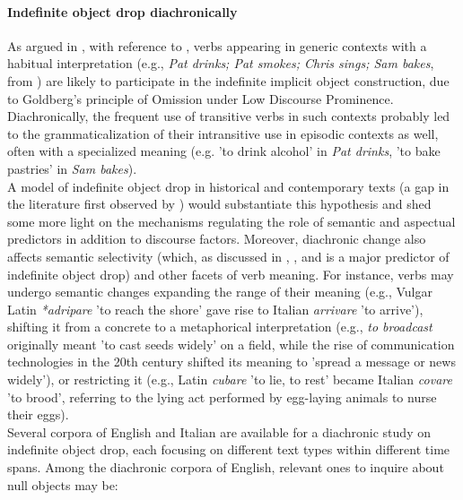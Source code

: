 \paragraph{Indefinite object drop diachronically}
As argued in , with reference to \textcite{Goldberg2001, Goldberg2005a, Lorenzetti2008, Glass2020}, verbs appearing in generic contexts with a habitual interpretation (e.g., \textit{Pat drinks; Pat smokes; Chris sings; Sam bakes}, from \textcite[518]{Goldberg2001}) are likely to participate in the indefinite implicit object construction, due to Goldberg's principle of Omission under Low Discourse Prominence. Diachronically, the frequent use of transitive verbs in such contexts probably led to the grammaticalization of their intransitive use in episodic contexts as well, often with a specialized meaning (e.g. 'to drink alcohol' in \textit{Pat drinks}, 'to bake pastries' in \textit{Sam bakes}).\\
A model of indefinite object drop in historical and contemporary texts (a gap in the literature first observed by \textcite{Goldberg2001}) would substantiate this hypothesis and shed some more light on the mechanisms regulating the role of semantic and aspectual predictors in addition to discourse factors. Moreover, diachronic change also affects semantic selectivity (which, as discussed in , , and  is a major predictor of indefinite object drop) and other facets of verb meaning. For instance, verbs may undergo semantic changes expanding the range of their meaning (e.g., Vulgar Latin \textit{*adripare} 'to reach the shore' gave rise to Italian \textit{arrivare} 'to arrive'), shifting it from a concrete to a metaphorical interpretation (e.g., \textit{to broadcast} originally meant 'to cast seeds widely' on a field, while the rise of communication technologies in the 20th century shifted its meaning to 'spread a message or news widely'), or restricting it (e.g., Latin \textit{cubare} 'to lie, to rest' became Italian \textit{covare} 'to brood', referring to the lying act performed by egg-laying animals to nurse their eggs).\\
Several corpora of English and Italian are available for a diachronic study on indefinite object drop, each focusing on different text types within different time spans. Among the diachronic corpora of English, relevant ones to inquire about null objects may be:
